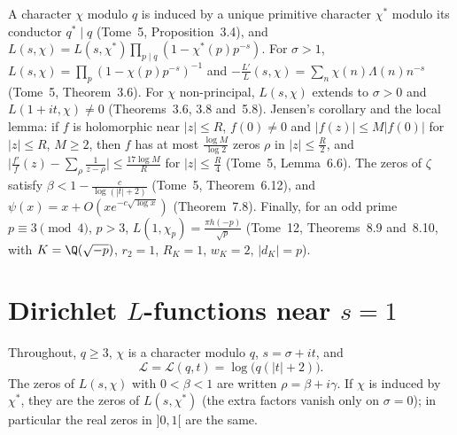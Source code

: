 \begin{reminder}
A character $\chi$ modulo $q$ is induced by a unique primitive character $\chi^*$ modulo its conductor $q^*\mid q$ (Tome~5, Proposition~3.4), and $L(s,\chi)=L(s,\chi^*)\prod_{p\mid q}(1-\chi^*(p)p^{-s})$. For $\sigma>1$, $L(s,\chi)=\prod_p(1-\chi(p)p^{-s})^{-1}$ and
$-\frac{L'}L(s,\chi)=\sum_n\chi(n)\Lambda(n)n^{-s}$ (Tome~5, Theorem~3.6). For $\chi$ non-principal, $L(s,\chi)$ extends to $\sigma>0$ and $L(1+it,\chi)\ne0$ (Theorems~3.6, 3.8 and~5.8). Jensen's corollary and the local lemma: if $f$ is holomorphic near $|z|\le R$, $f(0)\ne0$ and $|f(z)|\le M|f(0)|$ for $|z|\le R$, $M\ge2$, then $f$ has at most
$\frac{\log M}{\log2}$ zeros $\rho$ in $|z|\le\frac R2$, and $\bigl|\frac{f'}f(z)-\sum_\rho\frac1{z-\rho}\bigr|\le\frac{17\log M}R$ for $|z|\le\frac R4$ (Tome~5, Lemma~6.6). The zeros of $\zeta$ satisfy $\beta<1-\frac c{\log(|t|+2)}$ (Tome~5, Theorem~6.12), and $\psi(x)=x+O(xe^{-c\sqrt{\log x}})$ (Theorem~7.8). Finally, for an odd prime $p\equiv3\pmod4$, $p>3$,
$L(1,\chi_p)=\frac{\pi h(-p)}{\sqrt p}$ (Tome~12, Theorems~8.9 and~8.10, with $K=\Q(\sqrt{-p})$, $r_2=1$, $R_K=1$, $w_K=2$, $|d_K|=p$).
\end{reminder}

\section{Dirichlet \texorpdfstring{$L$}{L}-functions near \texorpdfstring{$s=1$}{s=1}}

Throughout, $q\ge3$, $\chi$ is a character modulo $q$, $s=\sigma+it$, and
\[
\mathcal L=\mathcal L(q,t)=\log\bigl(q(|t|+2)\bigr).
\]
The zeros of $L(s,\chi)$ with $0<\beta<1$ are written $\rho=\beta+i\gamma$. If $\chi$ is induced by $\chi^*$, they are the zeros of $L(s,\chi^*)$ (the extra factors vanish only on $\sigma=0$); in particular the real zeros in $]0,1[$ are the same.

